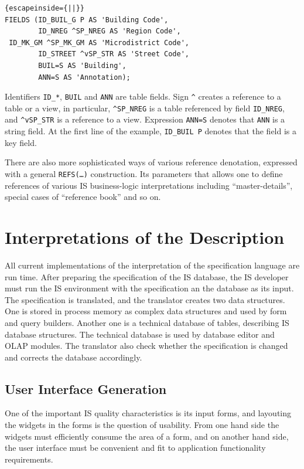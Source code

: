 \documentclass[conference]{IEEEtran}
\begin{document}
\begin{lstlisting}{escapeinside={||}}
FIELDS (ID_BUIL_G P AS 'Building Code',
        ID_NREG ^SP_NREG AS 'Region Code',
 ID_MK_GM ^SP_MK_GM AS 'Microdistrict Code',
        ID_STREET ^vSP_STR AS 'Street Code',
        BUIL=S AS 'Building',
        ANN=S AS 'Annotation);
\end{lstlisting}%

Identifiers \texttt{ID\_*}, \texttt{BUIL} and \texttt{ANN} are table fields.  Sign \texttt{\^} creates a reference to a table or a view, in particular, \texttt{\^{}SP\_NREG} is a table referenced by field \texttt{ID\_NREG}, and \texttt{\^{}vSP\_STR} is a reference to a view.  Expression \texttt{ANN=S} denotes that \texttt{ANN} is a string field.  At the first line of the example, \texttt{ID\_BUIL P} denotes that the field is a key field.

There are also more sophisticated ways of various reference denotation, expressed with a general \texttt{REFS(\ldots)} construction.  Its parameters that allows one to define references of various IS business-logic interpretations including ``master-details'', special cases of ``reference book'' and so on.

\section{Interpretations of the Description}
\label{sec:interpr-descr}

All current implementations of the interpretation of the specification language are run time.  After preparing the specification of the IS database, the IS developer must run the IS environment with the specification an the database as its input.  The specification is translated, and the translator creates two data structures.  One is stored in process memory as complex data structures and used by form and query builders.  Another one is a technical database of tables, describing IS database structures.  The technical database is used by database editor and OLAP modules.  The translator also check whether the specification is changed and corrects the database accordingly.

\subsection{User Interface Generation}
\label{sec:user-interace-form}
One of the important IS quality characteristics is its input forms, and layouting the widgets in the forms is the question of usability.  From one hand side the widgets must efficiently consume the area of a form, and on another hand side, the user interface must be convenient and fit to  application functionality requirements.
\end{document}
